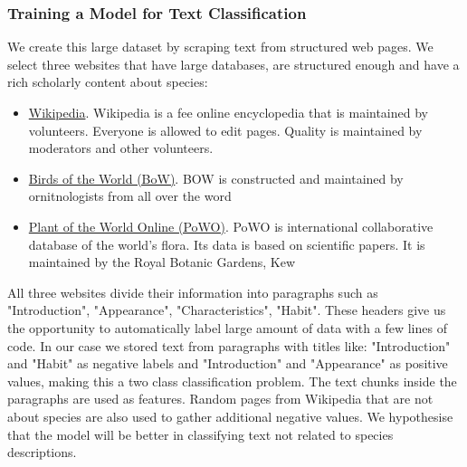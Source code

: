 \documentclass[a4paper, 12pt, oneside]{book} %
\begin{document}
\subsubsection{Training a Model for Text Classification} \label{par:reedloss}
We create this large dataset by scraping text from structured web pages.
We select three websites that have large databases, are structured enough and have a rich scholarly content about species:
\begin{itemize}
    \item \href{www.wikipedia.com}{Wikipedia}. Wikipedia is a fee online encyclopedia that is maintained by volunteers. Everyone is allowed to edit pages. Quality is maintained by moderators and other volunteers.
    \item \href{https://birdsoftheworld.org/bow/home}{Birds of the World (BoW)}. BOW is constructed and maintained by ornitnologists from all over the word \autocite{billerman_birds_2020}
    \item \href{https://powo.science.kew.org/}{Plant of the World Online (PoWO)}. PoWO is international collaborative database of the world's flora. Its data is based on scientific papers. It is maintained by the Royal Botanic Gardens, Kew  \autocite{facilitated_by_the_royal_botanic_gardens_plants_2019}
\end{itemize}
All three websites divide their information into paragraphs such as "Introduction", "Appearance", "Characteristics", "Habit".
These headers give us the opportunity to automatically label large amount of data with a few lines of code.
In our case we stored text from paragraphs with titles like:  "Introduction" and "Habit" as negative labels and "Introduction" and "Appearance" as positive values, making this a two class classification problem.
The text chunks inside the paragraphs are used as features.
Random pages from Wikipedia that are not about species are also used to gather additional negative values.
We hypothesise that the model will be better in classifying text not related to species descriptions.
\end{document}
